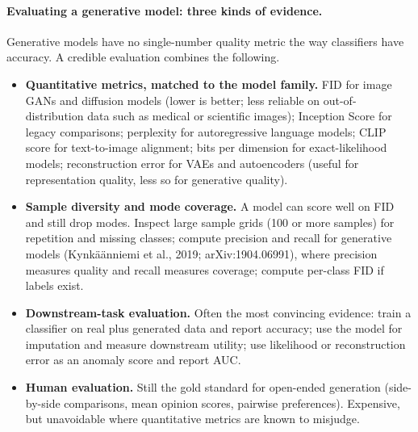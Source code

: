 \documentclass[11pt]{article}
\theoremstyle{remark}
\begin{document}
\paragraph{Evaluating a generative model: three kinds of evidence.}
Generative models have no single-number quality metric the way classifiers have accuracy. A credible evaluation combines the following.
\begin{itemize}[leftmargin=1.5em]
\item \textbf{Quantitative metrics, matched to the model family.} FID for image GANs and diffusion models (lower is better; less reliable on out-of-distribution data such as medical or scientific images); Inception Score for legacy comparisons; perplexity for autoregressive language models; CLIP score for text-to-image alignment; bits per dimension for exact-likelihood models; reconstruction error for VAEs and autoencoders (useful for representation quality, less so for generative quality).
\item \textbf{Sample diversity and mode coverage.} A model can score well on FID and still drop modes. Inspect large sample grids (100 or more samples) for repetition and missing classes; compute precision and recall for generative models (Kynk\"a\"anniemi et al., 2019; arXiv:1904.06991), where precision measures quality and recall measures coverage; compute per-class FID if labels exist.
\item \textbf{Downstream-task evaluation.} Often the most convincing evidence: train a classifier on real plus generated data and report accuracy; use the model for imputation and measure downstream utility; use likelihood or reconstruction error as an anomaly score and report AUC.
\item \textbf{Human evaluation.} Still the gold standard for open-ended generation (side-by-side comparisons, mean opinion scores, pairwise preferences). Expensive, but unavoidable where quantitative metrics are known to misjudge.
\end{itemize}
\end{document}

